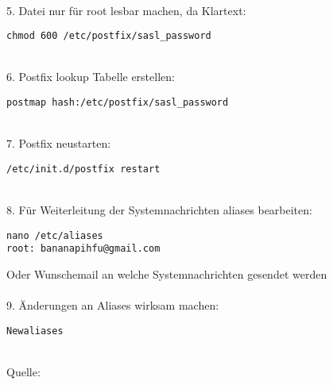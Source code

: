 ~\\
5. Datei nur für root lesbar machen, da Klartext:
\begin{lstlisting}
chmod 600 /etc/postfix/sasl_password 
\end{lstlisting}
~\\
6. Postfix lookup Tabelle erstellen:
\begin{lstlisting}
postmap hash:/etc/postfix/sasl_password
\end{lstlisting}
~\\
7. Postfix neustarten:
\begin{lstlisting}
/etc/init.d/postfix restart
\end{lstlisting}
~\\
8. Für Weiterleitung der Systemnachrichten aliases bearbeiten:
\begin{lstlisting}
nano /etc/aliases 
root: bananapihfu@gmail.com
\end{lstlisting}
Oder Wunschemail an welche Systemnachrichten gesendet werden\\
~\\
9. Änderungen an Aliases wirksam machen:
\begin{lstlisting}
Newaliases
\end{lstlisting}
~\\Quelle: \cite{postfix}



